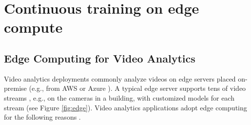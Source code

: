 
\section{Continuous training on edge compute}
\label{sec:background}



\subsection{Edge Computing for Video Analytics}
\label{subsec:edge}

Video analytics deployments commonly analyze videos on edge servers placed on-premise (e.g., from AWS \cite{aws-outposts} or Azure \cite{azure-ase}). %
A typical edge server supports tens of video streams \cite{videoedge}, e.g., on the cameras in a building, with customized models for each stream \cite{rocket-github} (see Figure \ref{fig:edge}).%
Video analytics applications adopt edge computing for the following reasons %
\cite{getmobile, edgevideo-1, ieee-computer}. 

